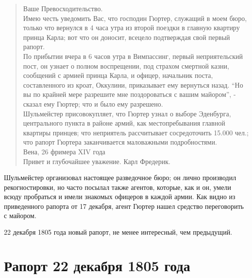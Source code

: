 \documentclass[
  oneside,
  12pt,
  titlepage]{book}
\begin{document}
\begin{quote}
Ваше Превосходительство.\\
Имею честь уведомить Вас, что господин Гюртер, служащий в моем бюро, только что вернулся в 4 часа утра из второй поездки в главную квартиру принца Карла; вот что он доносит, всецело подтверждая свой первый рапорт.\\
По прибытии вчера в 6 часов утра в Вимпассинг, первый неприятельский пост, он узнает о полном воспрещении, под страхом смертной казни, сообщений с армией принца Карла, и офицер, начальник поста, составленного из кроат, Оккулини, приказывает ему вернуться назад. ``Но вы по крайней мере разрешите мне поздороваться с вашим майором'', - сказал ему Гюртер; что и было ему разрешено.\\
Шульмейстер присовокупляет, что Гюртер узнал о выборе Эденбурга, центрального пункта в районе армий, как местопребывания главной квартиры принцев; что неприятель рассчитывает сосредоточить 15.000 чел.; что рапорт Гюртера заканчивается маловажными подробностями.\\
Вена, 26 фримера XIV года\\
Привет и глубочайшее уважение. Карл Фредерик.
\end{quote}

Шульмейстер организовал настоящее разведочное бюро; он лично производил рекогностировки, но часто посылал также агентов, которые, как и он, умели всюду пробраться и имели знакомых офицеров в каждой армии. Как видно из приведенного рапорта от 17 декабря, агент Гюртер нашел средство переговорить с майором.

22 декабря 1805 года новый рапорт, не менее интересный, чем предыдущий.

\hypertarget{ux440ux430ux43fux43eux440ux442-22-ux434ux435ux43aux430ux431ux440ux44f-1805-ux433ux43eux434ux430}{%
\section{Рапорт 22 декабря 1805 года}\label{ux440ux430ux43fux43eux440ux442-22-ux434ux435ux43aux430ux431ux440ux44f-1805-ux433ux43eux434ux430}}
\end{document}

